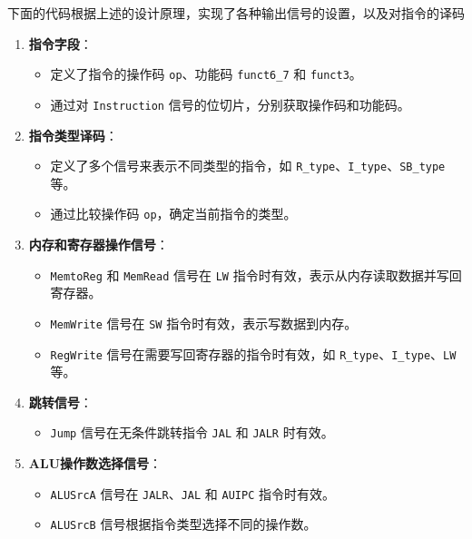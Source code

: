 \documentclass[12pt,hyperref,a4paper,UTF8]{ctexart}
\begin{document}
下面的代码根据上述的设计原理，实现了各种输出信号的设置，以及对指令的译码
\begin{enumerate}
    \item \textbf{指令字段}：
    \begin{itemize}
        \item 定义了指令的操作码 \texttt{op}、功能码 \texttt{funct6\_7} 和 \texttt{funct3}。
        \item 通过对 \texttt{Instruction} 信号的位切片，分别获取操作码和功能码。
    \end{itemize}

    \item \textbf{指令类型译码}：
    \begin{itemize}
        \item 定义了多个信号来表示不同类型的指令，如 \texttt{R\_type}、\texttt{I\_type}、\texttt{SB\_type} 等。
        \item 通过比较操作码 \texttt{op}，确定当前指令的类型。
    \end{itemize}

    \item \textbf{内存和寄存器操作信号}：
    \begin{itemize}
        \item \texttt{MemtoReg} 和 \texttt{MemRead} 信号在 \texttt{LW} 指令时有效，表示从内存读取数据并写回寄存器。
        \item \texttt{MemWrite} 信号在 \texttt{SW} 指令时有效，表示写数据到内存。
        \item \texttt{RegWrite} 信号在需要写回寄存器的指令时有效，如 \texttt{R\_type}、\texttt{I\_type}、\texttt{LW} 等。
    \end{itemize}

    \item \textbf{跳转信号}：
    \begin{itemize}
        \item \texttt{Jump} 信号在无条件跳转指令 \texttt{JAL} 和 \texttt{JALR} 时有效。
    \end{itemize}

    \item \textbf{ALU操作数选择信号}：
    \begin{itemize}
        \item \texttt{ALUSrcA} 信号在 \texttt{JALR}、\texttt{JAL} 和 \texttt{AUIPC} 指令时有效。
        \item \texttt{ALUSrcB} 信号根据指令类型选择不同的操作数。
    \end{itemize}
\end{enumerate}
\end{document}
